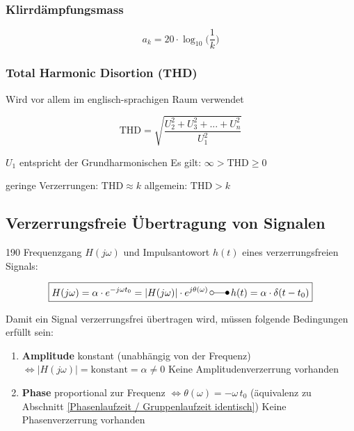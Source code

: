 \subsubsection{Klirrdämpfungsmass}
$$ \boxed{ a_k = 20 \cdot \log_{10} \Big( \frac{1}{k}  \Big)  } $$


\subsubsection{Total Harmonic Disortion (THD)}
Wird vor allem im englisch-sprachigen Raum verwendet

\begin{minipage}[c]{0.48\columnwidth}
   $$ \boxed{  \text{THD} = \sqrt{\frac{U_2^2 + U_3^2 + ...+ U_n^2}{U_1^2} } } $$
\end{minipage}
\hfill
\begin{minipage}[c]{0.48\columnwidth}
    $U_1$ entspricht der Grundharmonischen 
    \textrightarrow Es gilt:  $\infty > \text{THD} \geq 0$ 
\end{minipage}

\vspace{0.2cm}
geringe Verzerrungen: $\text{THD} \approx k$ \qquad allgemein: $\text{THD} > k$


\subsection{Verzerrungsfreie Übertragung von Signalen}{190}
Frequenzgang $H(j \omega)$ und Impulsantowort $h(t)$ eines verzerrungsfreien Signals:

$$ \boxed{ H(j \omega) = \alpha \cdot e^{- j \omega t_0} = | H(j \omega)|  \cdot e^{j \theta(\omega)}  \, \laplace \,  h(t) = \alpha \cdot \delta(t - t_0) } $$


Damit ein Signal verzerrungsfrei übertragen wird, müssen folgende Bedingungen erfüllt sein:

\begin{enumerate}
    \item \textbf{Amplitude} konstant (unabhängig von der Frequenz) $\Leftrightarrow | H(j \omega)| = \text{konstant} = \alpha \neq 0$ 
        \textrightarrow Keine Amplitudenverzerrung vorhanden
    \item \textbf{Phase} proportional zur Frequenz $\Leftrightarrow \theta(\omega) = - \omega \, t_0$
        (äquivalenz zu Abschnitt \ref{Phasenlaufzeit / Gruppenlaufzeit identisch})
        \textrightarrow Keine Phasenverzerrung vorhanden
\end{enumerate}


